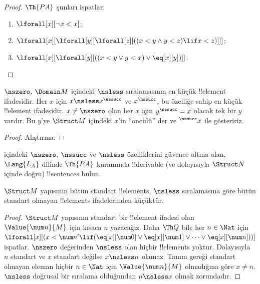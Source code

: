 \begin{proof}
$\Th{PA}$ şunları ispatlar:
\begin{enumerate}
\item $\lforall[x][\lnot x < x]$;
\item $\lforall[x][\lforall[y][\lforall[z][((x < y \land y < z) \lif x < z)]]]$;
\item $\lforall[x][\lforall[y][((x < y \lor y < x) \lor \eq[x][y])]]$.
\end{enumerate}
\end{proof}

\begin{prop}
 $\nszero$, $\Domain M$ içindeki
$\nsless$ sıralamasının en küçük !!{element} ifadesidir. Her $x$ için
$x\nsless x^\nssucc$ ve $x^\nssucc$, bu özelliğe sahip en küçük
!!{element} ifadesidir. $x\neq\nszero$ olan her $x$ için
$y^\nssucc=x$ olacak tek bir $y$ vardır. Bu $y$'ye $\Struct M$
içindeki $x$'in ``öncülü'' der ve $^\nssucc x$ ile gösteririz.
\end{prop}

\begin{proof}
Alıştırma.
\end{proof}

\begin{prob}
 içindeki $\nszero$, $\nssucc$
ve $\nsless$ özelliklerini güvence altına alan, $\Lang{L_A}$ dilinde
$\Th{PA}$ kuramında !!{derivable} (ve dolayısıyla $\Struct N$ içinde
doğru) !!{sentence}s bulun.
\end{prob}

\begin{prop}
$\Struct M$ yapısının bütün standart !!{element}s, $\nsless$
sıralamasına göre bütün standart olmayan !!{element}s ifadelerinden
küçüktür.
\end{prop}

\begin{proof}
$\Struct M$ yapısının standart bir !!{element} ifadesi olan
$\Value{\num n}{M}$ için kısaca $n$ yazacağız. Daha $\Th Q$ bile her
$n\in\Nat$ için
$\lforall[x][(x<\num n'\lif(\eq[x][\num0]\lor\eq[x][\num1]
\lor\dots\lor\eq[x][\num n]))]$ ispatlar. $\nszero$ değerinden
$\nsless$ olan hiçbir !!{element}s yoktur. Dolayısıyla $n$ standart ve
$x$ standart değilse $x\nsless n$ olamaz. Tanım gereği standart
olmayan eleman hiçbir $n\in\Nat$ için $\Value{\num n}{M}$ olmadığına
göre $x\neq n$. $\nsless$ doğrusal bir sıralama olduğundan
$n\nsless x$ olmak zorundadır.
\end{proof}


